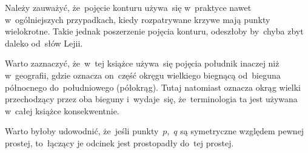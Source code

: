 \documentclass[a4paper,11pt]{article}
\begin{document}
Należy zauważyć, że~pojęcie konturu używa~się w~praktyce nawet
w~ogólniejszych przypadkach, kiedy rozpatrywane krzywe mają punkty
wielokrotne. Takie jednak poszerzenie pojęcia konturu, odeszłoby
by~chyba zbyt daleko od~słów Lejii.

\vspace{\spaceFour}



\start {} Warto zaznaczyć, że~w~tej książce używa~się pojęcia
południk inaczej niż w~geografii, gdzie oznacza on~część okręgu
wielkiego biegnącą od~bieguna północnego do~południowego (półokrąg).
Tutaj natomiast oznacza okrąg wielki przechodzący przez oba bieguny
i~wydaje~się, że~terminologia ta jest używana w~całej książce
konsekwentnie.

\vspace{\spaceFour}



\start {} Warto byłoby udowodnić, że~jeśli punkty~$p$,~$q$ są
symetryczne względem pewnej prostej, to~łączący je odcinek jest
prostopadły do~tej prostej.

\vspace{\spaceFour}











\end{document}
